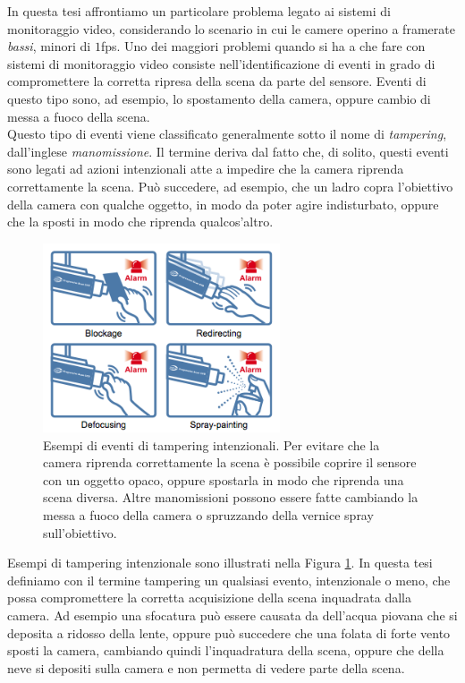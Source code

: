 In questa tesi affrontiamo un particolare problema legato ai sistemi di monitoraggio video, considerando lo scenario in cui le camere operino a framerate \textit{bassi}, minori di $1$fps.
Uno dei maggiori problemi quando si ha a che fare con sistemi di monitoraggio video consiste nell'identificazione di eventi in grado di compromettere la corretta ripresa della scena da parte del sensore.
Eventi di questo tipo sono, ad esempio, lo spostamento della camera, oppure cambio di messa a fuoco della scena.\\
Questo tipo di eventi viene classificato generalmente sotto il nome di \textit{tampering}, dall'inglese \textit{manomissione}.
Il termine deriva dal fatto che, di solito, questi eventi sono legati ad azioni intenzionali atte a impedire che la camera riprenda correttamente la scena.
Pu\`o succedere, ad esempio, che un ladro copra l'obiettivo della camera con qualche oggetto, in modo da poter agire indisturbato, oppure che la sposti in modo che riprenda qualcos'altro.
\begin{figure}
	\centering
	\includegraphics[width=7cm]{pictures/tamperdetection}
	\caption[Esempi di eventi di tampering intenzionali]{Esempi di eventi di tampering intenzionali. Per evitare che la camera riprenda correttamente la scena \`e possibile coprire il sensore con un oggetto opaco, oppure spostarla in modo che riprenda una scena diversa. Altre manomissioni possono essere fatte cambiando la messa a fuoco della camera o spruzzando della vernice spray sull'obiettivo.}
	\label{fig:tamperdetection}
\end{figure}
Esempi di tampering intenzionale sono illustrati nella Figura \ref{fig:tamperdetection}.
In questa tesi definiamo con il termine tampering un qualsiasi evento, intenzionale o meno, che possa compromettere la corretta acquisizione della scena inquadrata dalla camera.
Ad esempio una sfocatura pu\`o essere causata da dell'acqua piovana che si deposita a ridosso della lente, oppure pu\`o succedere che una folata di forte vento sposti la camera, cambiando quindi l'inquadratura della scena, oppure che della neve si depositi sulla camera e non permetta di vedere parte della scena.
